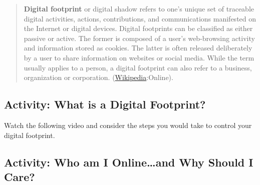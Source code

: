 \documentclass[
]{book}
\theoremstyle{definition}
\theoremstyle{definition}
\theoremstyle{definition}
\theoremstyle{definition}
\theoremstyle{remark}
\begin{document}
\begin{quote}
\textbf{Digital footprint} or digital shadow refers to one's unique set of traceable digital activities, actions, contributions, and communications manifested on the Internet or digital devices. Digital footprints can be classified as either passive or active. The former is composed of a user's web-browsing activity and information stored as cookies. The latter is often released deliberately by a user to share information on websites or social media. While the term usually applies to a person, a digital footprint can also refer to a business, organization or corporation. (\href{https://en.wikipedia.org/wiki/Digital_footprint}{Wikipedia}:Online).
\end{quote}

\hypertarget{activity-what-is-a-digital-footprint}{%
\subsection*{Activity: What is a Digital Footprint?}\label{activity-what-is-a-digital-footprint}}

\begin{reflect}
Watch the following video and consider the steps you would take to control your digital footprint.
\end{reflect}

\hypertarget{activity-who-am-i-onlineand-why-should-i-care}{%
\subsection*{Activity: Who am I Online\ldots and Why Should I Care?}\label{activity-who-am-i-onlineand-why-should-i-care}}
\end{document}
